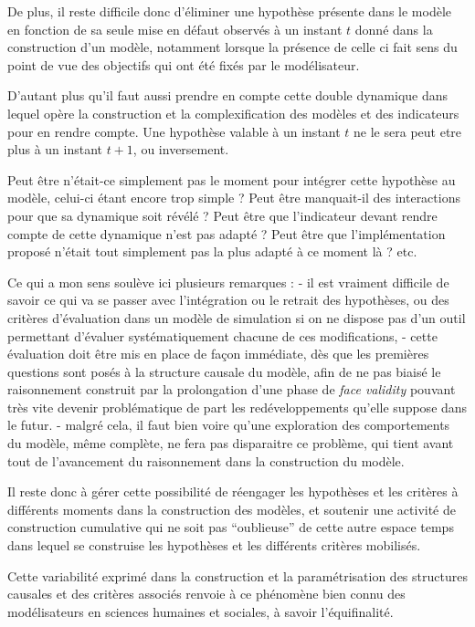 De plus, il reste difficile donc d'éliminer une hypothèse présente dans le modèle en fonction de sa seule mise en défaut observés à un instant $t$ donné dans la construction d'un modèle, notamment lorsque la présence de celle ci fait sens du point de vue des objectifs qui ont été fixés par le modélisateur. 

D'autant plus qu'il faut aussi prendre en compte cette double dynamique dans lequel opère la construction et la complexification des modèles et des indicateurs pour en rendre compte. Une hypothèse valable à un instant $t$ ne le sera peut etre plus à un instant $t + 1$, ou inversement. 

Peut être n'était-ce simplement pas le moment pour intégrer cette hypothèse au modèle, celui-ci étant encore trop simple ? Peut être manquait-il des interactions pour que sa dynamique soit révélé ? Peut être que l'indicateur devant rendre compte de cette dynamique n'est pas adapté ? Peut être que l'implémentation proposé n'était tout simplement pas la plus adapté à ce moment là ? etc. 

Ce qui a mon sens soulève ici plusieurs remarques : 
- il est vraiment difficile de savoir ce qui va se passer avec l'intégration ou le retrait des hypothèses, ou des critères d'évaluation dans un modèle de simulation si on ne dispose pas d'un outil permettant d'évaluer systématiquement chacune de ces modifications,
- cette évaluation doit être mis en place de façon immédiate, dès que les premières questions sont posés à la structure causale du modèle, afin de ne pas biaisé le raisonnement construit par la prolongation d'une phase de \textit{face validity} pouvant très vite devenir problématique de part les redéveloppements qu'elle suppose dans le futur.
- malgré cela, il faut bien voire qu'une exploration des comportements du modèle, même complète, ne fera pas disparaitre ce problème, qui tient avant tout de l'avancement du raisonnement dans la construction du modèle.

Il reste donc à gérer cette possibilité de réengager les hypothèses et les critères à différents moments dans la construction des modèles, et soutenir une activité de construction cumulative qui ne soit pas \enquote{oublieuse} de cette autre espace temps dans lequel se construise les hypothèses et les différents critères mobilisés. 

Cette variabilité exprimé dans la construction et la paramétrisation des structures causales et des critères associés renvoie à ce phénomène bien connu des modélisateurs en sciences humaines et sociales, à savoir l'équifinalité.

